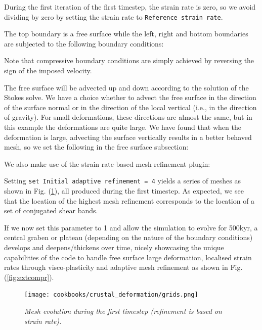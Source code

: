 \documentclass{article}
\begin{document}
During the first iteration of the first timestep, the strain rate is zero, so
we avoid dividing by zero by setting the strain rate to {\tt Reference strain rate}.


The top boundary is a free surface while the left, right and bottom boundaries are subjected 
to the following boundary conditions:



Note that compressive boundary conditions are simply achieved by reversing  
the sign of the imposed velocity.

The free surface will be advected up and down according to the solution of the Stokes solve.
We have a choice whether to advect the free surface in the direction of the surface normal
or in the direction of the local vertical (i.e., in the direction of gravity).
For small deformations, these directions are almost the same, but in this example the deformations 
are quite large. We have found that when the deformation is large, advecting the surface vertically 
results in a better behaved mesh, so we set the following in the free surface subsection:



We also make use of the strain rate-based mesh refinement plugin:



Setting 
{\tt   set Initial adaptive refinement        = 4}
yields a series of meshes as shown in Fig. (\ref{fig:meshes}), all produced during the 
first timestep. As expected, we see that the location of the highest mesh refinement
corresponds to the location of a set of conjugated shear bands.

If we now set this parameter to 1 and allow the simulation to evolve
for 500kyr, a central graben or plateau (depending on the nature
of the boundary conditions) develops and deepens/thickens over time, nicely showcasing 
the unique capabilities of the code to handle free surface large deformation, localised
strain rates through visco-plasticity and adaptive mesh refinement as
shown in Fig. (\ref{fig:extcompr}).

\begin{figure}
   \centering
   \texttt{[image: cookbooks/crustal\_deformation/grids.png]}
   \caption{\it Mesh evolution during the first timestep (refinement is based on strain rate).}
   \label{fig:meshes}
\end{figure}
\end{document}
